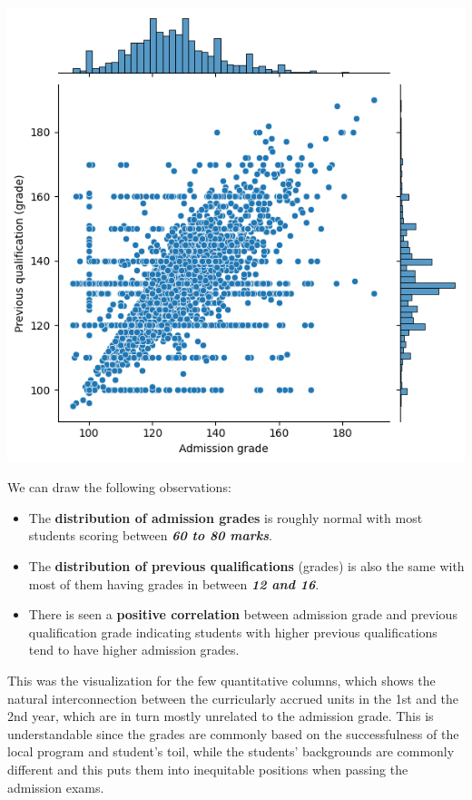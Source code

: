 \documentclass[
  letterpaper,
  DIV=11,
  numbers=noendperiod]{scrartcl}
\begin{document}
\includegraphics{report_AzadhdhinNedalYunisAlFraijat_files/figure-pdf/cell-22-output-1.png}

We can draw the following observations:

\begin{itemize}
\item
  The \textbf{distribution of admission grades} is roughly normal with
  most students scoring between \textbf{\emph{60 to 80 marks}}.
\item
  The \textbf{distribution of previous qualifications} (grades) is also
  the same with most of them having grades in between \textbf{\emph{12
  and 16}}.
\item
  There is seen a \textbf{positive correlation} between admission grade
  and previous qualification grade indicating students with higher
  previous qualifications tend to have higher admission grades.
\end{itemize}

This was the visualization for the few quantitative columns, which shows
the natural interconnection between the curricularly accrued units in
the 1st and the 2nd year, which are in turn mostly unrelated to the
admission grade. This is understandable since the grades are commonly
based on the successfulness of the local program and student's toil,
while the students' backgrounds are commonly different and this puts
them into inequitable positions when passing the admission exams.
\end{document}
